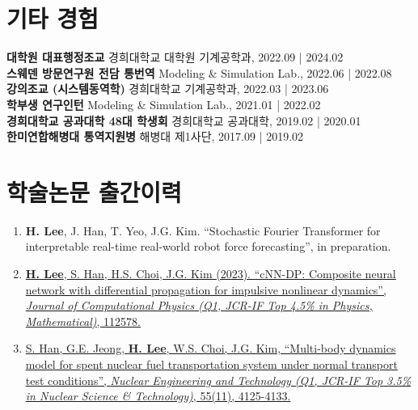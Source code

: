 \documentclass[a4paper,10pt]{extarticle}
\begin{document}
\section*{기타 경험}
\textbf{대학원 대표행정조교} \hfill 경희대학교 대학원 기계공학과, 2022.09 | 2024.02\\
\textbf{스웨덴 방문연구원 전담 통번역} \hfill Modeling \& Simulation Lab., 2022.06 | 2022.08\\
\textbf{강의조교 (시스템동역학)} \hfill 경희대학교 기계공학과, 2022.03 | 2023.06\\
\textbf{학부생 연구인턴} \hfill Modeling \& Simulation Lab., 2021.01 | 2022.02\\
\textbf{경희대학교 공과대학 48대 학생회} \hfill 경희대학교 공과대학, 2019.02 | 2020.01\\
\textbf{한미연합해병대 통역지원병} \hfill 해병대 제1사단, 2017.09 | 2019.02\\

\section*{학술논문 출간이력}
\noindent
\begin{enumerate}[leftmargin=.5cm]
	\item \textbf{H. Lee}, J. Han, T. Yeo, J.G. Kim. “Stochastic Fourier Transformer for interpretable real-time real-world robot force forecasting”, in preparation.
	\item \href{https://www.sciencedirect.com/science/article/pii/S0021999123006733?casa_token=ARUkhI8XI8YAAAAA:wTzCIauJvSlonWw-J-SlAFqPX6NZRQS-qBX59l4YN5O3caEppoglU0duVmMkZYf4nWYd7tm_D_E}{\textbf{H. Lee}, S. Han, H.S. Choi, J.G. Kim (2023). “cNN-DP: Composite neural network with differential propagation for impulsive nonlinear dynamics”, \textit{Journal of Computational Physics (Q1, JCR-IF Top 4.5\% in Physics, Mathematical)}, 112578.}
	\item \href{https://www.google.com/url?sa=t&rct=j&q=&esrc=s&source=web&cd=&cad=rja&uact=8&ved=2ahUKEwij36zWpNKCAxXMMEQIHSBfBMUQFnoECBEQAQ&url=https%3A%2F%2Fwww.sciencedirect.com%2Fscience%2Farticle%2Fpii%2FS1738573323003492&usg=AOvVaw1zj_G3k5c77uhMNnmu0EEC&opi=89978449}{S. Han, G.E. Jeong, \textbf{H. Lee}, W.S. Choi, J.G. Kim, “Multi-body dynamics model for spent nuclear fuel transportation system under normal transport test conditions”, \textit{Nuclear Engineering and Technology (Q1, JCR-IF Top 3.5\% in Nuclear Science \& Technology)}, 55(11), 4125-4133.}
\end{enumerate}
\end{document}
